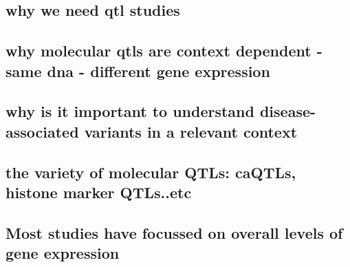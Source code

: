 

\subsection{why we need qtl studies}
\subsection{why molecular qtls are context dependent - same dna - different gene expression}
\subsection{why is it important to understand disease-associated variants in a relevant context}
\subsection{the variety of molecular QTLs: caQTLs, histone marker QTLs..etc}
\subsection{Most studies have focussed on overall levels of gene expression}